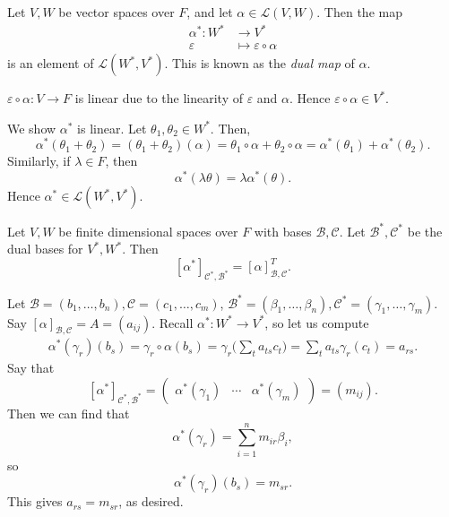 \documentclass[12pt]{article}
\begin{document}
\begin{definition}
	Let $V, W$ be vector spaces over $F$, and let $\alpha \in \mathcal{L}(V, W)$. Then the map
	\begin{align*}
		\alpha^{\ast} : W^{\ast} &\to V^{\ast} \\
		\varepsilon &\mapsto \varepsilon \circ \alpha
	\end{align*}
	is an element of $\mathcal{L}(W^{\ast}, V^{\ast})$. This is known as the \textit{dual map} of $\alpha$.
\end{definition}

\begin{proofbox}
	$\varepsilon \circ \alpha : V \to F$ is linear due to the linearity of $\varepsilon$ and $\alpha$. Hence $\varepsilon \circ \alpha \in V^{\ast}$.

We show $\alpha^{\ast}$ is linear. Let $\theta_1, \theta_2 \in W^{\ast}$. Then,
\[
	\alpha^{\ast}(\theta_1 + \theta_2) = (\theta_1 + \theta_2)(\alpha) = \theta_1 \circ \alpha + \theta_2 \circ \alpha = \alpha^{\ast} (\theta_1) + \alpha^{\ast}(\theta_2)
.\]
Similarly, if $\lambda \in F$, then
\[
	\alpha^{\ast}(\lambda \theta) = \lambda \alpha^{\ast}(\theta)
.\]
Hence $\alpha^{\ast} \in \mathcal{L}(W^{\ast}, V^{\ast})$.
\end{proofbox}

\begin{proposition}
	Let $V, W$ be finite dimensional spaces over $F$ with bases $\mathcal{B}, \mathcal{C}$. Let $\mathcal{B}^{\ast}, \mathcal{C}^{\ast}$ be the dual bases for $V^{\ast}, W^{\ast}$. Then
	\[
		[\alpha^{\ast}]_{\mathcal{C}^{\ast}, \mathcal{B}^{\ast}} = [\alpha]_{\mathcal{B},\mathcal{C}}^{T}
	.\]
\end{proposition}

\begin{proofbox}
	Let $\mathcal{B} = (b_1, \ldots, b_n), \mathcal{C} = (c_1, \ldots, c_m)$, $\mathcal{B}^{\ast} = (\beta_1, \ldots, \beta_n), \mathcal{C}^{\ast} = (\gamma_1, \ldots, \gamma_m)$. Say $[\alpha]_{\mathcal{B}, \mathcal{C}} = A = (a_{ij})$. Recall $\alpha^{\ast} : W^{\ast} \to V^{\ast}$, so let us compute
	\begin{align*}
		\alpha^{\ast}(\gamma_r)(b_s) = \gamma_r \circ \alpha(b_s) = \gamma_r \Biggl( \sum_{t} a_{ts} c_t \Biggr) = \sum_{t} a_{ts} \gamma_r(c_t) = a_{rs}.
	\end{align*}
	Say that
	\[
		[\alpha^{\ast}]_{\mathcal{C}^{\ast}, \mathcal{B}^{\ast}} = 
		\begin{pmatrix}
			\alpha^{\ast}(\gamma_1) & \cdots & \alpha^{\ast}(\gamma_m)
		\end{pmatrix}
		= (m_{ij})
	.\]
	Then we can find that
	\[
		\alpha^{\ast}(\gamma_r) = \sum_{i = 1}^{n} m_{ir}\beta_i
	,\]
	so
	\[
		\alpha^{\ast}(\gamma_r)(b_s) = m_{sr}
	.\]
	This gives $a_{rs} = m_{sr}$, as desired.
\end{proofbox}
\end{document}
